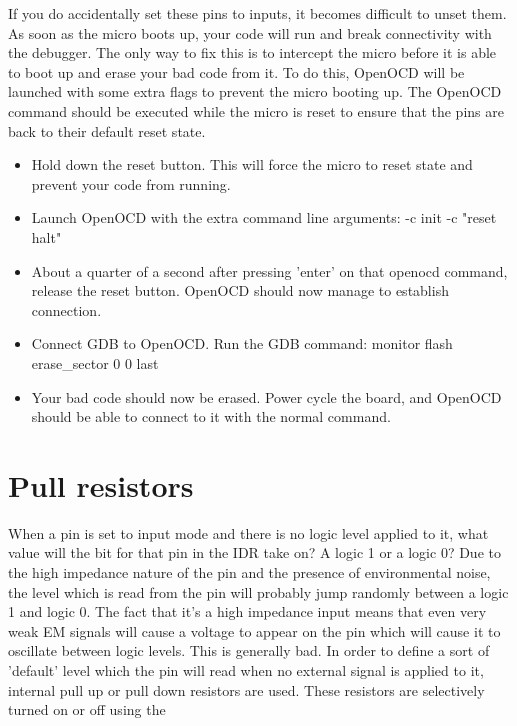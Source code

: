 If you do accidentally set these pins to inputs, it becomes difficult to unset them. As soon as the micro boots up, your code will run and break connectivity with the debugger. The only way to fix this is to intercept the micro before it is able to boot up and erase your bad code from it.
To do this, OpenOCD will be launched with some extra flags to prevent the micro booting up. The OpenOCD command should be executed while the micro is reset to ensure that the pins are back to their default reset state.
\begin{itemize}
  \item Hold down the reset button. This will force the micro to reset state and prevent your code from running.
  \item Launch OpenOCD with the extra command line arguments: -c init -c "reset halt"
  \item About a quarter of a second after pressing 'enter' on that openocd command, release the reset button. OpenOCD should now manage to establish connection.
  \item Connect GDB to OpenOCD. Run the GDB command: monitor flash erase\_sector 0 0 last
  \item Your bad code should now be erased. Power cycle the board, and OpenOCD should be able to connect to it with the normal command.
\end{itemize}

\section{Pull resistors}
When a pin is set to input mode and there is no logic level applied to it, what value will the bit for that pin in the IDR take on? A logic 1 or a logic 0? Due to the high impedance nature of the pin and the presence of environmental noise, the level which is read from the pin will probably jump randomly between a logic 1 and logic 0. The fact that it's a high impedance input means that even very weak EM signals will cause a voltage to appear on the pin which will cause it to oscillate between logic levels. This is generally bad. In order to define a sort of 'default' level which the pin will read when no external signal is applied to it, internal pull up or pull down resistors are used. These resistors are selectively turned on or off using the 

